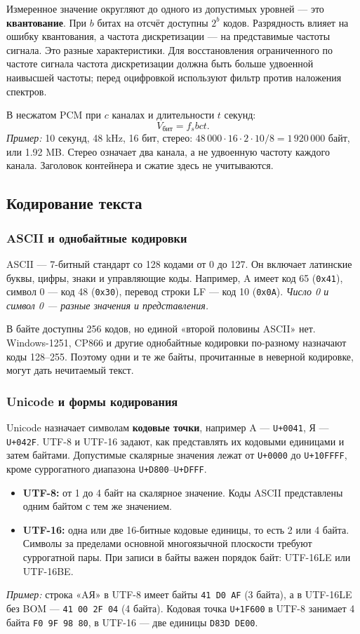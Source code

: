 Измеренное значение округляют до одного из допустимых уровней --- это
\textbf{квантование}. При $b$ битах на отсчёт доступны $2^b$ кодов.
Разрядность влияет на ошибку квантования, а частота дискретизации ---
на представимые частоты сигнала. Это разные характеристики.
Для восстановления ограниченного по частоте сигнала частота дискретизации
должна быть больше удвоенной наивысшей частоты; перед оцифровкой
используют фильтр против наложения спектров.

В несжатом PCM при $c$ каналах и длительности $t$ секунд:
\[
V_{\text{бит}}=f_s b c t.
\]
\textit{Пример:} 10 секунд, 48 kHz, 16 бит, стерео:
$48\,000\cdot16\cdot2\cdot10/8=1\,920\,000$ байт, или 1.92 MB.
Стерео означает два канала, а не удвоенную частоту каждого канала.
Заголовок контейнера и сжатие здесь не учитываются.

\subsection{Кодирование текста}
\subsubsection*{ASCII и однобайтные кодировки}
ASCII --- 7-битный стандарт со 128 кодами от 0 до 127.
Он включает латинские буквы, цифры, знаки и управляющие коды.
Например, A имеет код 65 (\texttt{0x41}), символ 0 --- код 48
(\texttt{0x30}), перевод строки LF --- код 10 (\texttt{0x0A}).
\emph{Число 0 и символ 0 --- разные значения и представления.}

В байте доступны 256 кодов, но единой «второй половины ASCII» нет.
Windows-1251, CP866 и другие однобайтные кодировки по-разному назначают
коды 128--255. Поэтому одни и те же байты, прочитанные в неверной кодировке,
могут дать нечитаемый текст.

\subsubsection*{Unicode и формы кодирования}
Unicode назначает символам \textbf{кодовые точки}, например A ---
\texttt{U+0041}, Я --- \texttt{U+042F}. UTF-8 и UTF-16 задают, как
представлять их кодовыми единицами и затем байтами.
Допустимые скалярные значения лежат от \texttt{U+0000} до
\texttt{U+10FFFF}, кроме суррогатного диапазона
\texttt{U+D800}--\texttt{U+DFFF}.

\begin{itemize}
    \item \textbf{UTF-8:} от 1 до 4 байт на скалярное значение.
    Коды ASCII представлены одним байтом с тем же значением.
    \item \textbf{UTF-16:} одна или две 16-битные кодовые единицы,
    то есть 2 или 4 байта. Символы за пределами основной многоязычной
    плоскости требуют суррогатной пары. При записи в байты важен порядок
    байт: UTF-16LE или UTF-16BE.
\end{itemize}
\textit{Пример:} строка «AЯ» в UTF-8 имеет байты
\texttt{41 D0 AF} (3 байта), а в UTF-16LE без BOM ---
\texttt{41 00 2F 04} (4 байта).
Кодовая точка \texttt{U+1F600} в UTF-8 занимает 4 байта
\texttt{F0 9F 98 80}, в UTF-16 --- две единицы \texttt{D83D DE00}.

